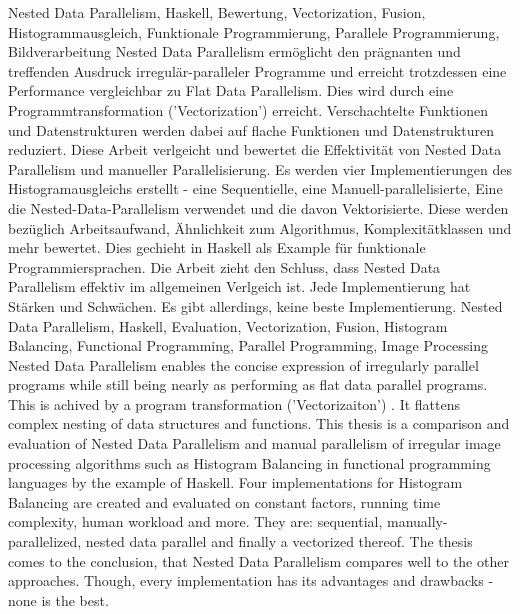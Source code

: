 \documentclass[draft=false
              ,paper=a4
              ,twoside=false
              ,fontsize=11pt
              ,headsepline
              ,BCOR10mm
              ,DIV11
              ]{scrbook}
\newcommand{\algo}[0]{Histogram Balancing\xspace}
\begin{document}
\HAWAbstractPage
{Nested Data Parallelism, Haskell,
Bewertung, Vectorization, Fusion, Histogrammausgleich,
Funktionale Programmierung, Parallele Programmierung, Bildverarbeitung}%
{
Nested Data Parallelism
ermöglicht den prägnanten und treffenden
Ausdruck irregulär-paralleler Programme
und erreicht trotzdessen eine Performance
vergleichbar zu Flat Data Parallelism.
Dies wird durch eine Programmtransformation ('Vectorization')
erreicht. Verschachtelte Funktionen und Datenstrukturen
werden dabei auf flache Funktionen und Datenstrukturen reduziert.
Diese Arbeit verlgeicht und bewertet die Effektivität
von Nested Data Parallelism und manueller Parallelisierung.
Es werden vier Implementierungen des Histogramausgleichs erstellt - 
eine Sequentielle, eine Manuell-parallelisierte,
Eine die Nested-Data-Parallelism verwendet und die davon Vektorisierte.
Diese werden bezüglich Arbeitsaufwand, Ähnlichkeit
zum Algorithmus, Komplexitätklassen und mehr bewertet.
Dies gechieht in Haskell als Example für funktionale Programmiersprachen.
Die Arbeit zieht den Schluss, dass Nested Data Parallelism
effektiv im allgemeinen Verlgeich ist.
Jede Implementierung hat Stärken und Schwächen. Es gibt
allerdings, keine beste Implementierung.}%
{Nested Data Parallelism, Haskell, Evaluation,
Vectorization, Fusion, Histogram Balancing,
Functional Programming, Parallel Programming,
Image Processing}%
{
Nested Data Parallelism enables
the concise expression of irregularly parallel programs
while still being nearly as performing as flat data parallel programs.
This is achived by a program transformation ('Vectorizaiton')
. It flattens complex nesting of data structures and functions.
This thesis is a comparison and evaluation of Nested Data Parallelism
and manual parallelism of irregular image processing algorithms such as \algo
in functional programming languages by the example of Haskell.
Four implementations for \algo are created and evaluated on
constant factors, running time complexity, human workload and more. 
They are: sequential, manually-parallelized,
nested data parallel and finally a vectorized thereof.
The thesis comes to the conclusion, that Nested Data Parallelism
compares well to the other approaches.
Though, every implementation has its advantages and drawbacks -
none is the best.}

\newpage
\singlespacing

\tableofcontents
\newpage
\listoftables
\listoffigures
\end{document}
